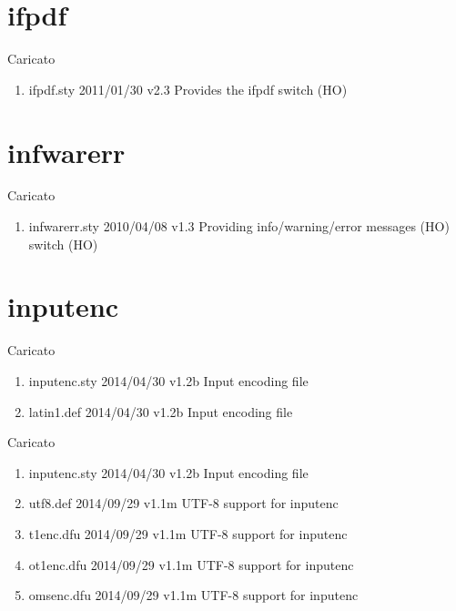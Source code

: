 \section{ifpdf}		 

Caricato 
\begin{enumerate}
\item ifpdf.sty 2011/01/30 v2.3 Provides the ifpdf switch (HO)
\end{enumerate}	
\section{infwarerr}		 

Caricato 
\begin{enumerate}
\item infwarerr.sty 2010/04/08 v1.3 Providing info/warning/error messages (HO) switch (HO)
\end{enumerate}	
\section{inputenc}		 

Caricato 
\begin{enumerate}
\item inputenc.sty 2014/04/30 v1.2b Input encoding file
\item latin1.def 2014/04/30 v1.2b Input encoding file	
\end{enumerate}		

Caricato 
\begin{enumerate}
\item inputenc.sty 2014/04/30 v1.2b Input encoding file
\item utf8.def 2014/09/29 v1.1m UTF-8 support for inputenc
\item t1enc.dfu 2014/09/29 v1.1m UTF-8 support for inputenc
\item ot1enc.dfu 2014/09/29 v1.1m UTF-8 support for inputenc
\item omsenc.dfu 2014/09/29 v1.1m UTF-8 support for inputenc
\end{enumerate}			 

